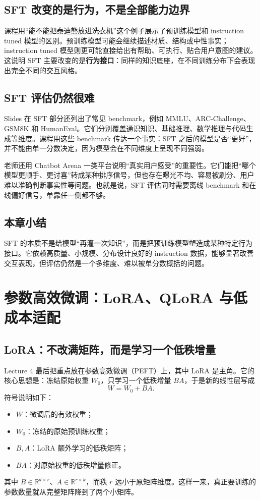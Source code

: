\documentclass[a4paper]{article}
\begin{document}
\subsection{SFT 改变的是行为，不是全部能力边界}
课程用“能不能把泰迪熊放进洗衣机”这个例子展示了预训练模型和 instruction tuned 模型的区别。预训练模型可能会继续描述材质、结构或中性事实；instruction tuned 模型则更可能直接给出有帮助、可执行、贴合用户意图的建议。这说明 SFT 主要改变的是\textbf{行为接口}：同样的知识底座，在不同训练分布下会表现出完全不同的交互风格。

\subsection{SFT 评估仍然很难}
Slides 在 SFT 部分还列出了常见 benchmark，例如 MMLU、ARC-Challenge、GSM8K 和 HumanEval。它们分别覆盖通识知识、基础推理、数学推理与代码生成等维度。课程用这些 benchmark 传达一个事实：SFT 之后的模型是否“更好”，并不能由单一分数决定，因为模型会在不同维度上呈现不同强弱。

老师还用 Chatbot Arena 一类平台说明“真实用户感受”的重要性。它们能把“哪个模型更顺手、更讨喜”转成某种排序信号，但也存在曝光不均、容易被刷分、用户难以准确判断事实性等问题。也就是说，SFT 评估同时需要离线 benchmark 和在线偏好信号，单靠任一侧都不够。

\subsection{本章小结}
SFT 的本质不是给模型“再灌一次知识”，而是把预训练模型塑造成某种特定行为接口。它依赖高质量、小规模、分布设计良好的 instruction 数据，能够显著改善交互表现，但评估仍然是一个多维度、难以被单分数概括的问题。

\section{参数高效微调：LoRA、QLoRA 与低成本适配}

\subsection{LoRA：不改满矩阵，而是学习一个低秩增量}
Lecture 4 最后把重点放在参数高效微调（PEFT）上，其中 LoRA 是主角。它的核心思想是：冻结原始权重 $W_0$，只学习一个低秩增量 $BA$，于是新的线性层写成
\[
W = W_0 + BA.
\]
符号说明如下：
\begin{itemize}
\item $W$：微调后的有效权重；
\item $W_0$：冻结的原始预训练权重；
\item $B, A$：LoRA 额外学习的低秩矩阵；
\item $BA$：对原始权重的低秩增量修正。
\end{itemize}
其中 $B \in \mathbb{R}^{d \times r}$、$A \in \mathbb{R}^{r \times k}$，而秩 $r$ 远小于原矩阵维度。这样一来，真正要训练的参数数量就从完整矩阵降到了两个小矩阵。
\end{document}
